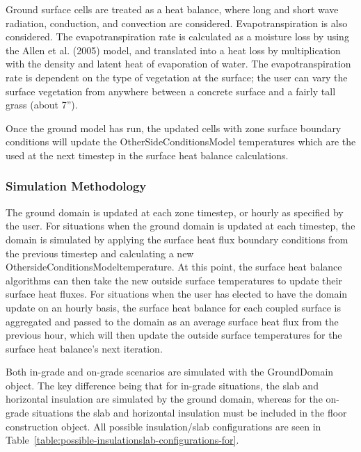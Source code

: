 Ground surface cells are treated as a heat balance, where long and short wave radiation, conduction, and convection are considered. Evapotranspiration is also considered. The evapotranspiration rate is calculated as a moisture loss by using the Allen et al. (2005) model, and translated into a heat loss by multiplication with the density and latent heat of evaporation of water. The evapotranspiration rate is dependent on the type of vegetation at the surface; the user can vary the surface vegetation from anywhere between a concrete surface and a fairly tall grass (about 7'').

Once the ground model has run, the updated cells with zone surface boundary conditions will update the OtherSideConditionsModel temperatures which are the used at the next timestep in the surface heat balance calculations.

\subsubsection{Simulation Methodology}\label{simulation-methodology-000}

The ground domain is updated at each zone timestep, or hourly as specified by the user. For situations when the ground domain is updated at each timestep, the domain is simulated by applying the surface heat flux boundary conditions from the previous timestep and calculating a new OthersideConditionsModeltemperature. At this point, the surface heat balance algorithms can then take the new outside surface temperatures to update their surface heat fluxes. For situations when the user has elected to have the domain update on an hourly basis, the surface heat balance for each coupled surface is aggregated and passed to the domain as an average surface heat flux from the previous hour, which will then update the outside surface temperatures for the surface heat balance's next iteration.

Both in-grade and on-grade scenarios are simulated with the GroundDomain object. The key difference being that for in-grade situations, the slab and horizontal insulation are simulated by the ground domain, whereas for the on-grade situations the slab and horizontal insulation must be included in the floor construction object. All possible insulation/slab configurations are seen in Table~\ref{table:possible-insulationslab-configurations-for}.

